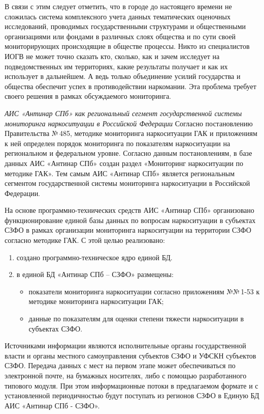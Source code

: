В связи с этим следует отметить, что в городе до настоящего времени не сложилась
система комплексного учета данных тематических оценочных исследований,
проводимых государственными структурами и общественными организациями или
фондами  в различных слоях общества и по сути своей мониторирующих происходящие
в обществе процессы. Никто из специалистов  ИОГВ не может точно сказать кто,
сколько, как и зачем исследует на подведомственных им территориях, какие
результаты получает и как их использует в дальнейшем. А ведь только объединение
усилий государства и общества обеспечит успех в противодействии наркомании. Эта
проблема требует своего решения в рамках обсуждаемого мониторинга.

\textit{АИС «Антинар СПб» как региональный сегмент государственной системы
мониторинга наркоситуации в Российской Федерации}
Согласно постановлению Правительства №\,485, методике мониторинга
наркоситуации ГАК и приложениям к ней определен порядок мониторинга по
показателям наркоситуации на региональном и федеральном уровне. Согласно данным
постановлениям, в базе данных АИС «Антинар СПб» создан раздел «Мониторинг
наркоситуации по методике ГАК». Тем самым АИС «Антинар СПб»
является региональным сегментом государственной системы мониторинга
наркоситуации в Российской Федерации.

На основе программно-технических средств АИС «Антинар СПб» организовано
функционирование единой базы данных по вопросам наркоситуации в субъектах СЗФО в
рамках организации мониторинга наркоситуации на территории СЗФО согласно
методике ГАК. С этой целью реализовано:
\begin{enumerate}
\item создано программно-техническое ядро единой БД.
\item в единой БД «Антинар СПб – СЗФО» размещены:
\begin{itemize}
    \item показатели мониторинга наркоситуации согласно приложениям №№\,1-53 
    к методике мониторинга наркоситуации ГАК; 
    \item данные по показателям для оценки степени тяжести наркоситуации в
        субъектах СЗФО.
\end{itemize}
\end{enumerate}
 Источниками информации являются исполнительные органы государственной
 власти и органы местного самоуправления субъектов СЗФО и УФСКН субъектов СЗФО. 
 Передача данных с мест на первом этапе может обеспечиваться по электронной
 почте, на бумажных носителях, либо с помощью разработанного типового модуля.
 При этом информационные потоки в предлагаемом формате и с установленной
 периодичностью будут поступать из регионов СЗФО в Единую БД АИС «Антинар СПб -
 СЗФО».

